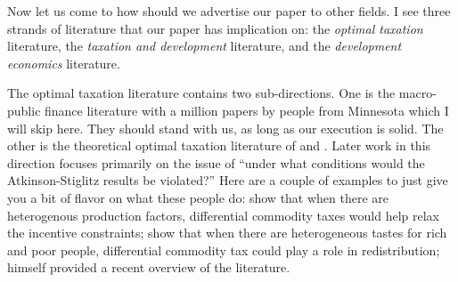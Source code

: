\documentclass[twoside,11pt,leqno]{article}
\begin{document}
Now let us come to how should we advertise our paper to other fields. I see three strands of literature that our paper has implication on: the \textit{optimal taxation} literature, the \textit{taxation and development} literature, and the \textit{development economics} literature.

The optimal taxation literature contains two sub-directions. One is the macro-public finance literature with a million papers by people from Minnesota which I will skip here. They should stand with us, as long as our execution is solid. The other is the theoretical optimal taxation literature of \citet{DiamondMirrlees:1971a,DiamondMirrlees:1971b} and \citet{AtkinsonStiglitz:1976}. Later work in this direction focuses primarily on the issue of ``under what conditions would the Atkinson-Stiglitz results be violated?'' Here are a couple of examples to just give you a bit of flavor on what these people do: \citet{Naito:1999} show that when there are heterogenous production factors, differential commodity taxes would help relax the incentive constraints; \citet{Saez:2002} show that when there are heterogeneous tastes for rich and poor people, differential commodity tax could play a role in redistribution; \citet{Stiglitz:2018} himself provided a recent overview of the literature.
\end{document}
